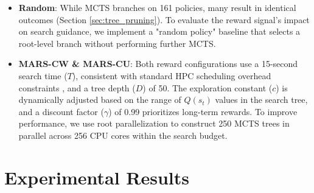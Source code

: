 \documentclass[conference]{IEEEtran}
\newcommand{\jor}[1]{\textcolor{green}{[jor:#1]}}
\begin{document}
\begin{itemize}
     \item \textbf{Random}: While MCTS branches on 161 policies, many result in identical outcomes (Section \ref{sec:tree_pruning}). To evaluate the reward signal's impact on search guidance, we implement a "random policy" baseline that selects a root-level branch without performing further MCTS.
    \item \textbf{MARS-CW \& MARS-CU}: Both reward configurations use a 15-second search time ($T$), consistent with standard HPC scheduling overhead constraints \cite{fan_deep_2021, fan_scheduling_2019}, and a tree depth ($D$) of 50. The exploration constant ($c$) is dynamically adjusted based on the range of $Q(s_t)$ values in the search tree, and a discount factor ($\gamma$) of 0.99 prioritizes long-term rewards. To improve performance, we use root parallelization \cite{parallel1} to construct 250 MCTS trees in parallel across 256 CPU cores within the search budget.
\end{itemize}



\section{Experimental Results}
\end{document}
